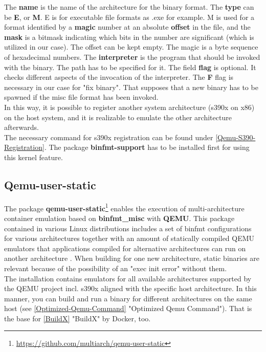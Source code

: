 The \textbf{name} is the name of the architecture for the binary format. The \textbf{type} can be \textbf{E}, or \textbf{M}. E is for executable file formats as .exe for example. M is used for a format identified by a \textbf{magic} number at an absolute \textbf{offset} in the file, and the \textbf{mask} is a bitmask indicating which bits in the number are significant\cite{Slackware2020} (which is utilized in our case). 
The offset can be kept empty. The magic is a byte sequence of hexadecimal numbers. The \textbf{interpreter} is the program that should be invoked with the binary\cite{Guenther2020}. 
The path has to be specified for it. The field \textbf{flag} is optional. It checks different aspects of the invocation of the interpreter. The \textbf{F} flag is necessary in our case for "fix binary". 
That supposes that a new binary has to be spawned if the misc file format has been invoked.\\
In this way, it is possible to register another system architecture (s390x on x86) on the host system, and it is realizable to emulate the other architecture afterwards. \\
The necessary command for s390x registration can be found under \ref{Qemu-S390-Registration}.
The package \textbf{binfmt-support} has to be installed first for using this kernel feature. 

\subsection{Qemu-user-static}\label{qemu-user-static}

The package \textbf{qemu-user-static}\footnote{\url{https://github.com/multiarch/qemu-user-static}} enables the execution of multi-architecture container emulation based on \textbf{binfmt\_misc} with \textbf{\gls{QEMU}}. This package contained in various Linux distributions includes a set of binfmt configurations for various architectures together with an amount of statically compiled \gls{QEMU} emulators that applications compiled for alternative architectures can run on another architecture \cite{Yang2019}. When building for one new architecture, static binaries are relevant because of the possibility of an "exec init error" without them. \\
The installation contains emulators for all available architectures supported by the \gls{QEMU} project incl. s390x aligned with the specific host architecture. In this manner, you can build and run a binary for different architectures on the same host (see \ref{Optimized-Qemu-Command} "Optimized Qemu Command"). That is the base for \ref{BuildX} "BuildX" by Docker, too.

